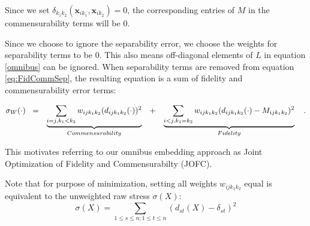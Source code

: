\documentclass[11pt]{article} %
\begin{document}
Since we set ${ \delta_{k_1k_2}}(\bm{x}_{ik_1},\bm{x}_{ik_2}) = 0$, the corresponding entries of $M$ in the commensurability terms will be 0.

Since we choose to ignore  the separability error, we choose the weights for separability terms to be 0. This also means off-diagonal elements of $L$ in equation \eqref{omnibus} can be ignored. When separability terms are removed from equation \eqref{eq:FidCommSep}, the resulting equation  is a sum of fidelity and commensurability error terms:


\begin{align}
\sigma_W(\cdot)\hspace{3pt}   
\hspace{3pt}&=&\underbrace{\sum_{i=j,k_1< k_2}  {w_{ij{k_1}{k_2}}(d_{ij{k_1}{k_2}}(\cdot))^2}}_{Commensurability}  \hspace{10pt}  &  +&\underbrace{\sum_{i< j,k_1=k_2}  {w_{ij{k_1}{k_2}}(d_{ij{k_1}{k_2}}(\cdot)-M_{ijk_1k_2})^2  }  } _{Fidelity}\notag\label{eq:FidCommSep}\hspace{10pt} .
\end{align}

This motivates  referring to our omnibus embedding approach as Joint Optimization of Fidelity and Commensurabilty (JOFC).

Note that for purpose of minimization, setting all weights  ${w_{ij{k_1}{k_2}}}$ equal is equivalent to the unweighted raw stress $\sigma(X)$:
\begin{equation}
\sigma(X)=\sum_{1\leq s\leq n;1\leq t\leq n} {(d_{st}(X)-\delta_{st})^2  }\label{stress}
\end{equation}

\end{document}
